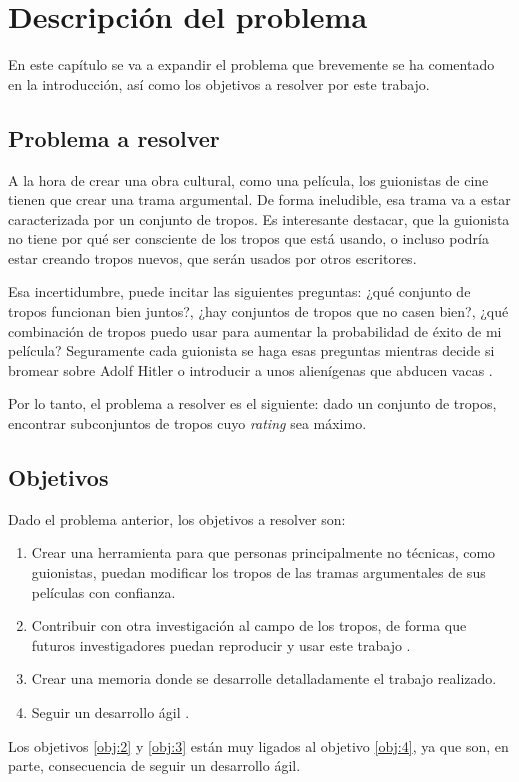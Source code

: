 \chapter{Descripción del problema}

En este capítulo se va a expandir el problema que brevemente se ha comentado en
la introducción, así como los objetivos a resolver por este trabajo.

\section{Problema a resolver}

A la hora de crear una obra cultural, como una película, los guionistas de cine
tienen que crear una trama argumental. De forma ineludible, esa trama va a
estar caracterizada por un conjunto de tropos. Es interesante destacar, que la
guionista no tiene por qué ser consciente de los tropos que está usando, o incluso podría estar creando tropos nuevos, que serán usados por otros
escritores.

Esa incertidumbre, puede incitar las siguientes preguntas: ¿qué conjunto de
tropos funcionan bien juntos?, ¿hay conjuntos de tropos que no casen bien?,
¿qué combinación de tropos puedo usar para aumentar la probabilidad de éxito de
mi película? Seguramente cada guionista se haga esas preguntas mientras decide
si bromear sobre Adolf Hitler \cite{tropo:AdolfHitlarious} o introducir a unos
alienígenas que abducen vacas \cite{tropo:AliensStealCattle}.

Por lo tanto, el problema a resolver es el siguiente: dado un conjunto de
tropos, encontrar subconjuntos de tropos cuyo \emph{rating} sea máximo.

\section{Objetivos} \label{section:goals}

Dado el problema anterior, los objetivos a resolver son:

\begin{enumerate}
      \item \label{obj:1} Crear una herramienta para que personas principalmente no técnicas, como
            guionistas, puedan modificar los tropos de las tramas argumentales de sus películas con confianza.
      \item \label{obj:2} Contribuir con otra investigación al campo de los tropos, de forma que futuros
            investigadores puedan reproducir y usar este trabajo \cite{desarrolloagil}.
      \item \label{obj:3} Crear una memoria donde se desarrolle detalladamente el trabajo realizado.
      \item \label{obj:4} Seguir un desarrollo ágil \cite{desarrolloagil}.
\end{enumerate}

Los objetivos \ref{obj:2} y \ref{obj:3} están muy ligados al objetivo \ref{obj:4}, ya que son, en parte,
consecuencia de seguir un desarrollo ágil.
